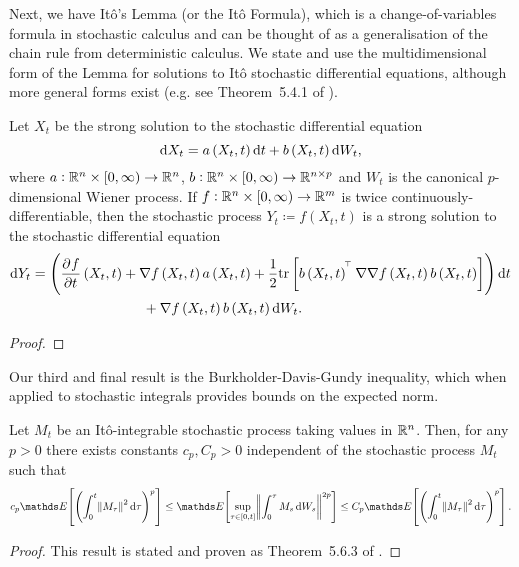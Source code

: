 Next, we have It\^o's Lemma (or the It\^o Formula), which is a change-of-variables formula in stochastic calculus and can be thought of as a generalisation of the chain rule from deterministic calculus.
We state and use the multidimensional form of the Lemma for solutions to It\^o stochastic differential equations, although more general forms exist (e.g. see Theorem~5.4.1 of \citet{KallianpurSundar_2014_StochasticAnalysisDiffusion}).

\begin{theorem}[It\^o's Lemma]\label{thm:ito_lemma}
	Let \(X_t\) be the strong solution to the stochastic differential equation
	\[
		\dif X_t = a\left(X_t, t\right)\dif t + b\left(X_t, t\right)\dif W_t,
	\]
	where \(a: \mathbb{R}^n \times [0,\infty) \to \mathbb{R}^n\), \(b: \mathbb{R}^n \times [0,\infty) \to \mathbb{R}^{n\times p}\) and \(W_t\) is the canonical \(p\)-dimensional Wiener process.
	If \(f: \mathbb{R}^n \times [0, \infty) \to \mathbb{R}^m\) is twice continuously-differentiable, then the stochastic process \(Y_t \coloneqq f\left(X_t, t\right)\) is a strong solution to the stochastic differential equation
	\begin{align*}
		\dif Y_t & = \left(\dpd{f}{t}\left(X_t, t\right) + \nabla f\left(X_t, t\right) a\left(X_t, t\right) + \frac12\mathrm{tr}\left[b\left(X_t, t\right)^{\T} \nabla\nabla f\left(X_t, t\right) b\left(X_t, t\right)\right] \right)\dif t \\
		         & \qquad\qquad\qquad\qquad + \nabla f\left(X_t, t\right)b\left(X_t, t\right) \dif W_t.
	\end{align*}
\end{theorem}

\begin{proof}

\end{proof}

Our third and final result is the Burkholder-Davis-Gundy inequality, which when applied to stochastic integrals provides bounds on the expected norm.

\begin{theorem}\label{thm:bdg}
	Let \(M_t\) be an It\^o-integrable stochastic process taking values in \(\mathbb{R}^n\).
	Then, for any \(p > 0\) there exists constants \(c_p, C_p > 0\) independent of the stochastic process \(M_t\) such that
	\[
		c_p\avg{\left(\int_0^t{\norm{M_\tau}^2\dif \tau}\right)^p} \leq \avg{\sup_{\tau \in \left[0, t\right]}\norm{\int_0^\tau{M_s\dif W_s}}^{2p}} \leq C_p\avg{\left(\int_0^t{\norm{M_\tau}^2\dif \tau}\right)^p}.
	\]
\end{theorem}
\begin{proof}
	This result is stated and proven as Theorem~5.6.3 of \citet{KallianpurSundar_2014_StochasticAnalysisDiffusion}.
\end{proof}


